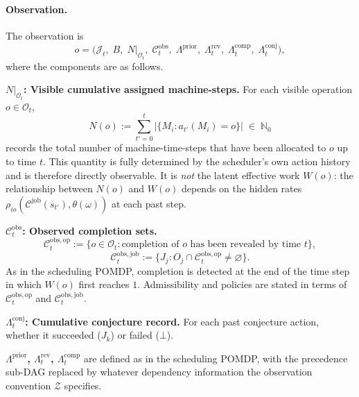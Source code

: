\paragraph{Observation.} The observation is
\[
o = \bigl(\mathcal{J}_t,\; B,\; N|_{\mathcal{O}_t},\;
\mathcal{C}_t^{\mathrm{obs}},\;
\Lambda^{\mathrm{prior}},\; \Lambda_t^{\mathrm{rev}},\;
\Lambda_t^{\mathrm{comp}},\; \Lambda_t^{\mathrm{conj}}\bigr),
\]
where the components are as follows.

\medskip
\noindent\textbf{$N|_{\mathcal{O}_t}$: Visible cumulative assigned machine-steps.}
For each visible operation $o \in \mathcal{O}_t$,
\[
N(o) := \sum_{t'=0}^{t} \bigl|\{M_i : a_{t'}(M_i) = o\}\bigr| \;\in\; \mathbb{N}_0
\]
records the total number of machine-time-steps that have been allocated to $o$ up to
time $t$. This quantity is fully determined by the scheduler's own action history and
is therefore directly observable. It is \emph{not} the latent effective work $W(o)$:
the relationship between $N(o)$ and $W(o)$ depends on the hidden rates
$\rho_{io}(\mathcal{C}^{\mathrm{job}}(s_{t'}), \theta(\omega))$ at each past step.

\medskip
\noindent\textbf{$\mathcal{C}_t^{\mathrm{obs}}$: Observed completion sets.}
\[
\mathcal{C}_t^{\mathrm{obs,op}} := \{o \in \mathcal{O}_t :
\text{completion of } o \text{ has been revealed by time } t\},
\]
\[
\mathcal{C}_t^{\mathrm{obs,job}} := \{J_j :
O_j \cap \mathcal{C}_t^{\mathrm{obs,op}} \neq \varnothing\}.
\]
As in the scheduling POMDP, completion is detected at the end of the time step in
which $W(o)$ first reaches $1$. Admissibility and policies are stated in terms of
$\mathcal{C}_t^{\mathrm{obs,op}}$ and $\mathcal{C}_t^{\mathrm{obs,job}}$.

\medskip
\noindent\textbf{$\Lambda_t^{\mathrm{conj}}$: Cumulative conjecture record.}
For each past conjecture action, whether it succeeded ($J_k$) or failed ($\bot$).

\medskip
\noindent\textbf{$\Lambda^{\mathrm{prior}}$, $\Lambda_t^{\mathrm{rev}}$,
$\Lambda_t^{\mathrm{comp}}$} are defined as in the scheduling POMDP, with the
precedence sub-DAG replaced by whatever dependency information the observation
convention $\mathcal{Z}$ specifies.

